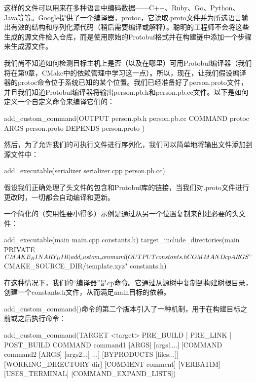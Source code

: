 这样的文件可以用来在多种语言中编码数据——C++、Ruby、Go、Python、Java等等。Google提供了一个编译器，protoc，它读取.proto文件并为所选语言输出有效的结构和序列化源代码（稍后需要编译或解释）。聪明的工程师不会将这些生成的源文件检入仓库，而是使用原始的Protobuf格式并在构建链中添加一个步骤来生成源文件。

我们尚不知道如何检测目标主机上是否（以及在哪里）可用Protobuf编译器（我们将在第9章，CMake中的依赖管理中学习这一点）。所以，现在，让我们假设编译器的protoc命令位于系统已知的某个位置。我们已经准备好了person.proto文件，并且我们知道Protobuf编译器将输出person.pb.h和person.pb.cc文件。以下是如何定义一个自定义命令来编译它们的：

\begin{cmake}
add_custom_command(OUTPUT person.pb.h person.pb.cc
        COMMAND protoc ARGS person.proto
        DEPENDS person.proto
)
\end{cmake}

然后，为了允许我们的可执行文件进行序列化，我们可以简单地将输出文件添加到源文件中：

\begin{cmake}
add_executable(serializer serializer.cpp person.pb.cc)
\end{cmake}

假设我们正确处理了头文件的包含和Protobuf库的链接，当我们对.proto文件进行更改时，一切都会自动编译和更新。

一个简化的（实用性要小得多）示例是通过从另一个位置复制来创建必要的头文件：


\begin{cmake}
add_executable(main main.cpp constants.h)
target_include_directories(main PRIVATE ${CMAKE_BINARY_DIR})
add_custom_command(OUTPUT constants.h COMMAND cp
                   ARGS "${CMAKE_SOURCE_DIR}/template.xyz" constants.h)
\end{cmake}

在这种情况下，我们的“编译器”是cp命令。它通过从源树中复制到构建树根目录，创建一个constants.h文件，从而满足main目标的依赖。


add\_custom\_command()命令的第二个版本引入了一种机制，用于在构建目标之前或之后执行命令：

\begin{cmake}
add_custom_command(TARGET <target>
                   PRE_BUILD | PRE_LINK | POST_BUILD
                   COMMAND command1 [ARGS] [args1...]
                   [COMMAND command2 [ARGS] [args2...] ...]
                   [BYPRODUCTS [files...]]
                   [WORKING_DIRECTORY dir]
                   [COMMENT comment]
                   [VERBATIM] [USES_TERMINAL]
                   [COMMAND_EXPAND_LISTS])
\end{cmake}

